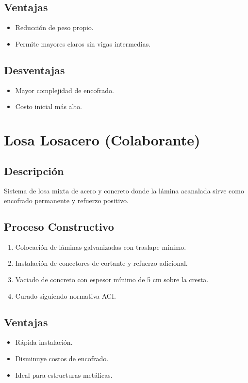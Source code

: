 \documentclass[12pt,a4paper]{article}
\begin{document}
	\subsection{Ventajas}
	\begin{itemize}
		\item Reducción de peso propio.
		\item Permite mayores claros sin vigas intermedias.
	\end{itemize}
	
	\subsection{Desventajas}
	\begin{itemize}
		\item Mayor complejidad de encofrado.
		\item Costo inicial más alto.
	\end{itemize}
	
	\section{Losa Losacero (Colaborante)}
	\subsection{Descripción}
	Sistema de losa mixta de acero y concreto donde la lámina acanalada sirve como encofrado permanente y refuerzo positivo.
	
	\subsection{Proceso Constructivo}
	\begin{enumerate}
		\item Colocación de láminas galvanizadas con traslape mínimo.
		\item Instalación de conectores de cortante y refuerzo adicional.
		\item Vaciado de concreto con espesor mínimo de 5 cm sobre la cresta.
		\item Curado siguiendo normativa ACI.
	\end{enumerate}
	
	\subsection{Ventajas}
	\begin{itemize}
		\item Rápida instalación.
		\item Disminuye costos de encofrado.
		\item Ideal para estructuras metálicas.
	\end{itemize}
	
\end{document}
